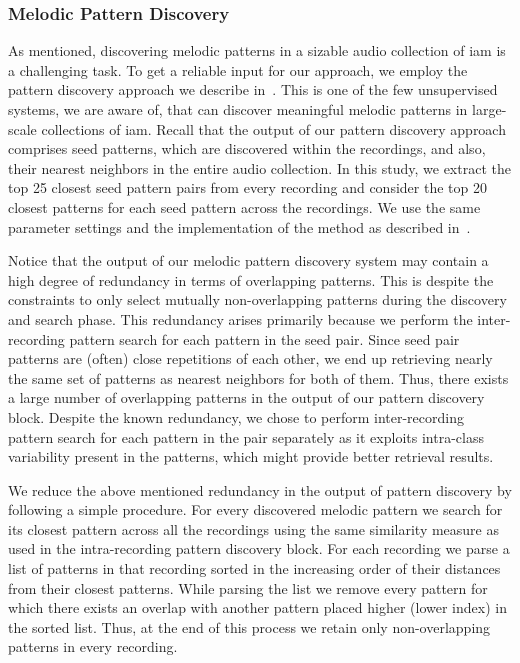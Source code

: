 {\subsubsection{Melodic Pattern Discovery}
\label{sec:patterns_characterization_pattern_discovery}

As mentioned, discovering melodic patterns in a sizable audio collection of \gls{iam} is a challenging task. To get a reliable input for our approach, we employ the pattern discovery approach we describe in~. This is one of the few unsupervised systems, we are aware of, that can discover meaningful melodic patterns in large-scale collections of \gls{iam}. Recall that the output of our pattern discovery approach comprises seed patterns, which are discovered within the recordings, and also, their nearest neighbors in the entire audio collection. In this study, we extract the top 25 closest seed pattern pairs from every recording and consider the top 20 closest patterns for each seed pattern across the recordings. We use the same parameter settings and the implementation of the method as described in~. 

Notice that the output of our melodic pattern discovery system may contain a high degree of redundancy in terms of overlapping patterns. This is despite the constraints to only select mutually non-overlapping patterns during the discovery and search phase. This redundancy arises primarily because we perform the inter-recording pattern search for each pattern in the seed pair. Since seed pair patterns are (often) close repetitions of each other, we end up retrieving nearly the same set of patterns as nearest neighbors for both of them. Thus, there exists a large number of overlapping patterns in the output of our pattern discovery block. Despite the known redundancy, we chose to perform inter-recording pattern search for each pattern in the pair separately as it exploits intra-class variability present in the patterns, which might provide better retrieval results.

We reduce the above mentioned redundancy in the output of pattern discovery by following a simple procedure. For every discovered melodic pattern we search for its closest pattern across all the recordings using the same similarity measure as used in the intra-recording pattern discovery block. For each recording we parse a list of patterns in that recording sorted in the increasing order of their distances from their closest patterns. While parsing the list we remove every pattern for which there exists an overlap with another pattern placed higher (lower index) in the sorted list. Thus, at the end of this process we retain only non-overlapping patterns in every recording.



}
